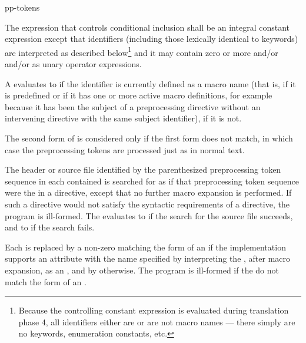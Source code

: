 %
\begin{bnf}
\br
     pp-tokens \terminal{)}
\end{bnf}

\pnum
The expression that controls conditional inclusion
shall be an integral constant expression except that
identifiers
(including those lexically identical to keywords)
are interpreted as described below\footnote{Because the controlling constant expression is evaluated
during translation phase 4,
all identifiers either are or are not macro names ---
there simply are no keywords, enumeration constants, etc.}
and it may contain zero or more  and/or
 and/or
 as unary operator expressions.

\pnum
A  evaluates to 
if the identifier is currently defined
as a macro name
(that is, if it is predefined
or if it has one or more active macro definitions,
for example because
it has been the subject of a
preprocessing directive
without an intervening
directive with the same subject identifier),  if it is not.

\pnum
The second form of 
is considered only if the first form does not match,
in which case the preprocessing tokens are processed just as in normal text.

\pnum
The header or source file identified by
the parenthesized preprocessing token sequence
in each contained 
is searched for as if that preprocessing token sequence
were the  in a  directive,
except that no further macro expansion is performed.
If such a directive would not satisfy the syntactic requirements
of a  directive, the program is ill-formed.
The  evaluates
to  if the search for the source file succeeds, and
to  if the search fails.

\pnum
Each  is replaced by
a non-zero 
matching the form of an 
if the implementation supports an attribute
with the name specified by interpreting
the , after macro expansion,
as an ,
and by  otherwise.
The program is ill-formed if the 
do not match the form of an .

